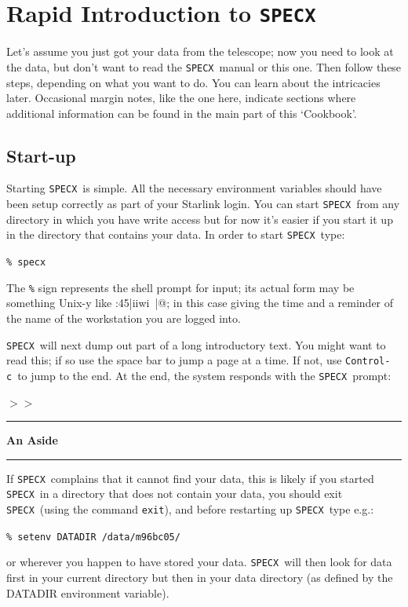 \documentclass[11pt,twoside]{article}
\newcommand{\xlabel}[1]{}
\newcommand{\SPECX}{{\tt SPECX}}
\newcommand{\margnote}[1]
{\marginpar{({\it{\ref{#1}}})}}
\newcommand{\SP}{{$>\!>$}}
\newcommand{\aside}
{\begin{center}\rule[1mm]{1.0in}{0.015in}\hspace*{2mm}
{\bf An Aside}
\hspace*{2mm}\rule[1mm]{1.0in}{0.015in}\end{center}\vspace*{-0.2in}}
\newcommand{\ctrlc}{{\tt Control-c}}
\begin{document}
\section{\xlabel{rapid_introduction_to_specx}Rapid Introduction to \SPECX }
\label{sec:rapid-specx}
Let's assume you just got your data from the telescope; 
now you need to
look at the data, but don't want to read the \SPECX\ manual or this
one. Then follow these steps, depending on what you want to do. You
can learn about the intricacies later. Occasional margin notes, like
the one here\margnote{sec:specx-intro}, indicate sections where
additional information can be found in the main part of this
`Cookbook'.

\subsection{Start-up}
\label{sec:start-up}
\margnote{sec:finding-the-data}

Starting \SPECX\ is simple. All the necessary environment variables should
have been setup correctly as part of your Starlink login.
You can start \SPECX\ from any directory in which you have write access but
for now it's easier if you start it up in the directory that contains your
data. In order to start \SPECX\, type:

\verb|% specx|

\reversemarginpar
The {\tt \%} sign represents the shell prompt for input; its actual
form may be something Unix-y like :45|iiwi~|@; in this case
giving the time and a reminder of the name of the workstation you are
logged into.

\SPECX\ will next dump out part of a long introductory
text. You might want to read this; if so use the space bar to jump a
page at a time. If not, use \ctrlc\ to jump to the end. At the end,
the system responds with the \SPECX\ prompt:

\SP

\aside
If \SPECX\ complains that it cannot find your data, this is likely
if you started \SPECX\ in a directory that does not contain your data, 
you
should exit \SPECX\ (using the command {\tt{exit}}), and before
restarting up \SPECX\ type e.g.:

\verb|% setenv DATADIR /data/m96bc05/|

or wherever you happen to have stored your data. \SPECX\ will then 
look for data first in your current directory but then in your data 
directory (as defined by the DATADIR environment variable).
\end{document}
